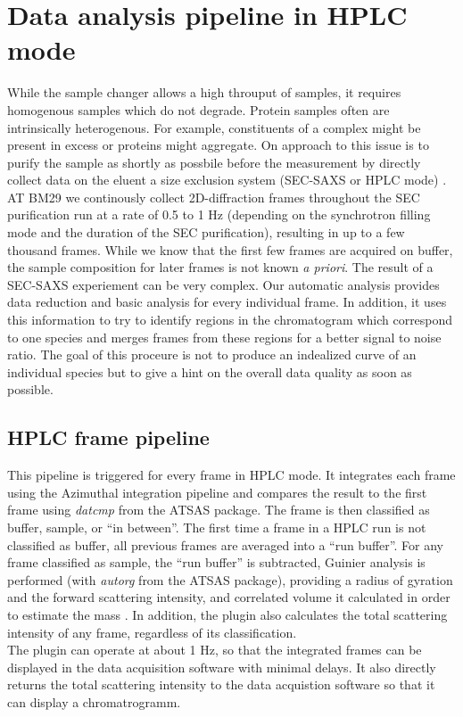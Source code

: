 \documentclass[preprint,pdf]{iucr}              %
\begin{document}
\section{Data analysis pipeline in HPLC mode}
While the sample changer allows a high throuput of samples, it requires homogenous samples which do not degrade. Protein samples often are intrinsically heterogenous. For example, constituents of a complex might be present in excess or proteins might aggregate. On approach to this issue is to purify the sample as shortly as possbile before the measurement by directly collect data on the eluent a size exclusion system (SEC-SAXS or HPLC mode) \cite{SECBM29,otherSEC}. AT BM29 we continously collect 2D-diffraction frames throughout the SEC purification run at a rate of 0.5 to 1 Hz (depending on the synchrotron filling mode and the duration of the SEC purification), resulting in up to a few thousand frames. While we know that the first few frames are acquired on buffer, the sample composition for later frames is not known \textit{a priori}. The result of a SEC-SAXS experiement can be very complex. Our automatic analysis provides data reduction and basic analysis for every individual frame. In addition, it uses this information to try to identify regions in the chromatogram which correspond to one species and merges frames from these regions for a better signal to noise ratio. The goal of this proceure is not to produce an indealized curve of an individual species but to give a hint on the overall data quality as soon as possible.

\subsection{HPLC frame pipeline}

This pipeline is triggered for every frame in HPLC mode. It integrates each frame using the Azimuthal integration pipeline and compares the result to the first frame using \textit{datcmp} from the ATSAS package. The frame is then classified as buffer, sample, or ``in between''. The first time a frame in a HPLC run is not classified as buffer, all previous frames are averaged into a ``run buffer''.
For any frame classified as sample, the ``run buffer'' is subtracted, Guinier analysis is performed (with \textit{autorg} from the ATSAS package), providing a radius of gyration and the forward scattering intensity, and correlated volume it calculated in order to estimate the mass \cite{RamboTainerNature2013}. In addition, the plugin also calculates the total scattering intensity of any frame, regardless of its classification. \\
The plugin can operate at about 1 Hz, so that the integrated frames can be displayed in the data acquisition software with minimal delays. It also directly returns the total scattering intensity to the data acquistion software so that it can display a chromatrogramm.
\end{document}

